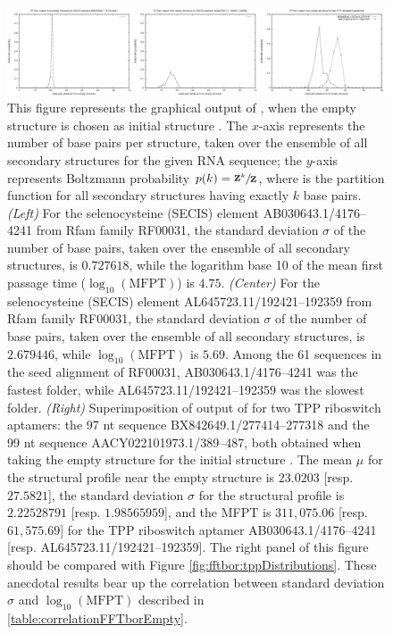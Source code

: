 \begin{figure}[!ht]
\centering
\includegraphics[width=.9\textwidth]{Figures/FFTbor/correlationFFTborEmpty.pdf}
\caption{This figure represents the
graphical output of \fftbor, when the empty structure is chosen as
initial structure \strSt.
The $x$-axis represents the number of base pairs per structure,
taken over the ensemble of all secondary structures for the given RNA
sequence; the $y$-axis represents Boltzmann probability
$p(k) = \sfrac{{\bf Z}^{k}_{}}{{\bf Z}^{}_{}}$,
where \bfZ{}{} is the partition function for all secondary structures
having exactly $k$ base pairs.
{\em (Left)}
For the selenocysteine (SECIS) element AB030643.1/4176--4241 from Rfam family
RF00031, the standard deviation $\sigma$ of the number of base pairs,
taken over the ensemble of all secondary structures, is
$0.727618$, while the logarithm base 10 of the mean first passage time ($\log_{10}(\text{MFPT})$)
is $4.75$.
{\em (Center)}
For the selenocysteine (SECIS) element
AL645723.11/192421--192359 from Rfam family
RF00031, the standard deviation $\sigma$ of the number of base pairs,
taken over the ensemble of all secondary structures, is
$2.679446$, while $\log_{10}(\text{MFPT})$ is $5.69$.
Among the 61 sequences in the seed alignment of RF00031,
AB030643.1/4176--4241 was the fastest folder, while
AL645723.11/192421--192359 was the slowest folder.
{\em (Right)}
Superimposition of output of \fftbor for two TPP riboswitch aptamers: the
97 nt sequence BX842649.1/277414--277318 and the
99 nt sequence AACY022101973.1/389--487, both obtained when
taking the empty structure for the initial structure \strSt.
The mean $\mu$ for the \fftbor structural profile near the empty
structure is $23.0203$  [resp. $27.5821$], the
standard deviation $\sigma$ for the \fftbor structural profile
is $2.22528791$  [resp. $1.98565959$], and the \kinfold MFPT is
$311,075.06$ [resp. $61,575.69$] for the TPP riboswitch aptamer
AB030643.1/4176--4241 [resp.  AL645723.11/192421--192359].
The right panel of this figure should be compared with Figure
\ref{fig:fftbor:tppDistributions}.
These anecdotal results bear up the correlation between standard deviation
$\sigma$ and $\log_{10}(\text{MFPT})$ described in \ref{table:correlationFFTborEmpty}.
}
\label{fig:fftbor:correlationFFTborEmpty}
\end{figure}

